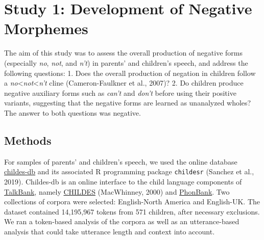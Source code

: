 \documentclass[man,floatsintext,draftall]{apa6}
\begin{document}
\hypertarget{study-1-development-of-negative-morphemes}{%
\section{Study 1: Development of Negative Morphemes}\label{study-1-development-of-negative-morphemes}}

The aim of this study was to assess the overall production of negative forms (especially \emph{no}, \emph{not}, and \emph{n't}) in parents' and children's speech, and address the following questions: 1. Does the overall production of negation in children follow a \emph{no}\textless{}\emph{not}\textless{}\emph{n't} cline (Cameron-Faulkner et al., 2007)? 2. Do children produce negative auxiliary forms such as \emph{can't} and \emph{don't} before using their positive variants, suggesting that the negative forms are learned as unanalyzed wholes? The answer to both questions was negative.

\hypertarget{methods}{%
\subsection{Methods}\label{methods}}

For samples of parents' and children's speech, we used the online database \href{childes-db.stanford.edu}{childes-db} and its associated R programming package \texttt{childesr} (Sanchez et al., 2019). Childes-db is an online interface to the child language components of \href{https://talkbank.org/}{TalkBank}, namely \href{https://childes.talkbank.org/}{CHILDES} (MacWhinney, 2000) and \href{https://phonbank.talkbank.org/}{PhonBank}. Two collections of corpora were selected: English-North America and English-UK. The dataset contained 14,195,967 tokens from 571 children, after necessary exclusions. We ran a token-based analysis of the corpora as well as an utterance-based analysis that could take utterance length and context into account.
\end{document}
